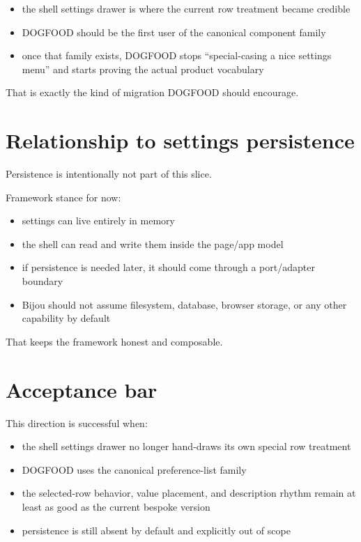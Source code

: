 \begin{itemize}
\tightlist
\item
  the shell settings drawer is where the current row treatment became credible
\item
  DOGFOOD should be the first user of the canonical component family
\item
  once that family exists, DOGFOOD stops ``special-casing a nice settings menu'' and starts proving the actual product vocabulary
\end{itemize}

That is exactly the kind of migration DOGFOOD should encourage.

\section{Relationship to settings persistence}\label{record-054-relationship-to-settings-persistence}

Persistence is intentionally not part of this slice.

Framework stance for now:

\begin{itemize}
\tightlist
\item
  settings can live entirely in memory
\item
  the shell can read and write them inside the page/app model
\item
  if persistence is needed later, it should come through a port/adapter boundary
\item
  Bijou should not assume filesystem, database, browser storage, or any other capability by default
\end{itemize}

That keeps the framework honest and composable.

\section{Acceptance bar}\label{record-054-acceptance-bar}

This direction is successful when:

\begin{itemize}
\tightlist
\item
  the shell settings drawer no longer hand-draws its own special row treatment
\item
  DOGFOOD uses the canonical preference-list family
\item
  the selected-row behavior, value placement, and description rhythm remain at least as good as the current bespoke version
\item
  persistence is still absent by default and explicitly out of scope
\end{itemize}

